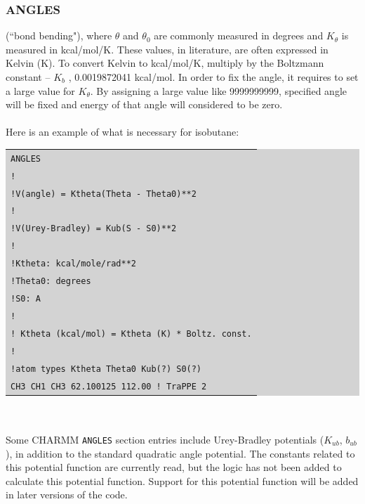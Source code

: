 \subsubsection{ANGLES}
(``bond bending"), where \texttt{$\theta$} and \texttt{$\theta_0$} are commonly measured in degrees and \texttt{$K_{\theta}$} is measured in kcal/mol/K.  These values, in literature, are often expressed in Kelvin (K). To convert Kelvin to kcal/mol/K, multiply by the Boltzmann constant -- \texttt{$K_b$} , 0.0019872041 kcal/mol. In order to fix the angle, it requires to set a large value for \texttt{$K_{\theta}$}. By assigning a large value like 9999999999, specified angle will be fixed and energy of that angle will considered to be zero.\\\\
Here is an example of what is necessary for isobutane:\\
\colorbox{lightgray}{
\begin{tabular}{l}
\texttt{ANGLES}\\
\texttt{!}\\
\texttt{!V(angle) = Ktheta(Theta - Theta0)**2}\\
\texttt{!}\\
\texttt{!V(Urey-Bradley) = Kub(S - S0)**2}\\
\texttt{!}\\
\texttt{!Ktheta: kcal/mole/rad**2}\\
\texttt{!Theta0: degrees}\\
\texttt{!S0: A}\\
\texttt{!}\\
\texttt{! Ktheta (kcal/mol) = Ktheta (K) * Boltz. const.}\\
\texttt{!}\\
\texttt{!atom types         Ktheta       Theta0   Kub(?)  S0(?)}\\
\texttt{CH3 CH1 CH3         62.100125    112.00 ! TraPPE 2}\\
\end{tabular}}\\\\
Some CHARMM \texttt{ANGLES} section entries include Urey-Bradley potentials (\texttt{$K_{ub}$}, \texttt{$b_{ub}$}), in addition to the standard quadratic angle potential. The constants related to this potential function are currently read, but the logic has not been added to calculate this potential function. Support for this potential function will be added in later versions of the code.\\
